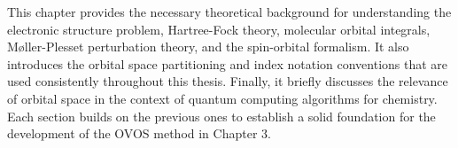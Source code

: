 %       
%       
%       
%       
%

This chapter provides the necessary theoretical background for understanding the electronic structure problem, Hartree-Fock theory, molecular orbital integrals, Møller-Plesset perturbation theory, and the spin-orbital formalism. It also introduces the orbital space partitioning and index notation conventions that are used consistently throughout this thesis. Finally, it briefly discusses the relevance of orbital space in the context of quantum computing algorithms for chemistry. Each section builds on the previous ones to establish a solid foundation for the development of the OVOS method in Chapter 3.


